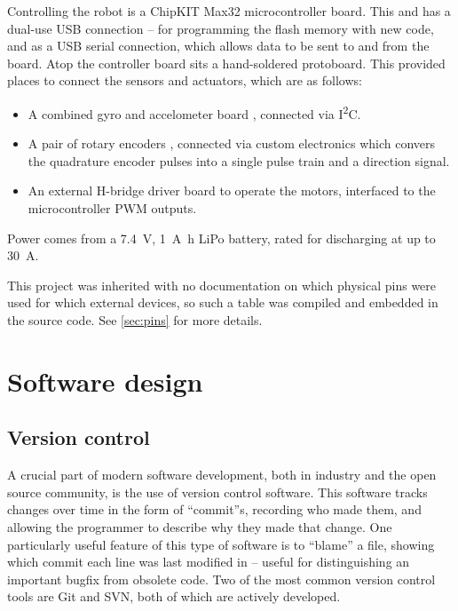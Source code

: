 \documentclass[main.tex]{subfiles}
\begin{document}
	Controlling the robot is a ChipKIT Max32 microcontroller board\cite{max32}. This and has a dual-use USB connection -- for programming the flash memory with new code, and as a USB serial connection, which allows data to be sent to and from the board. Atop the controller board sits a hand-soldered protoboard. This provided places to connect the sensors and actuators, which are as follows:
	\begin{itemize}[noitemsep]
		\item
			A combined gyro and accelometer board \cite{imu}, connected via I\textsuperscript{2}C.
		\item
			A pair of rotary encoders \cite{encoder}, connected via custom electronics which convers the quadrature encoder pulses into a single pulse train and a direction signal.
		\item
			An external H-bridge driver board to operate the motors, interfaced to the microcontroller PWM outputs.
	\end{itemize}
	Power comes from a \SI{7.4}{\volt}, \SI{1}{\ampere\hour}  LiPo battery, rated for discharging at up to \SI{30}{\ampere}.

	This project was inherited with no documentation on which physical pins were used for which external devices, so such a table was compiled and embedded in the source code.
	See \cref{sec:pins} for more details.

\section{Software design}

	\subsection{Version control}

	A crucial part of modern software development, both in industry and the open source community, is the use of version control software. 
	This software tracks changes over time in the form of \enquote{commit}s, recording who made them, and allowing the programmer to describe why they made that change.
	One particularly useful feature of this type of software is to \enquote{blame} a file, showing which commit each line was last modified in -- useful for distinguishing an important bugfix from obsolete code.
	Two of the most common version control tools are Git and SVN, both of which are actively developed.
\end{document}
